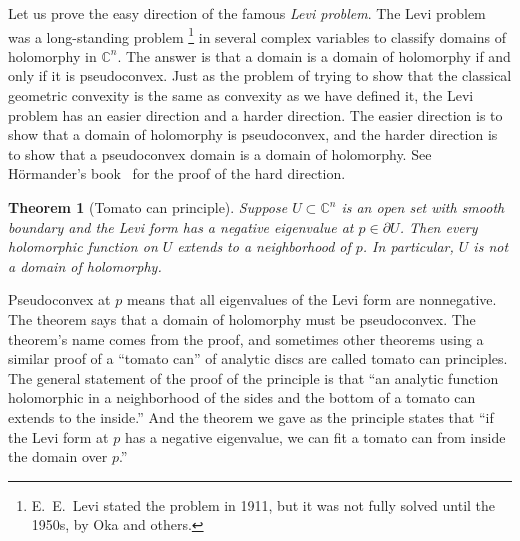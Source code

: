 \documentclass[12pt,openany]{book}
\newcommand{\C}{{\mathbb{C}}}
\newcommand{\myindex}[1]{#1\index{#1}}
\theoremstyle{plain}
\newtheorem{thm}{Theorem}[section]
\theoremstyle{remark}
\theoremstyle{definition}
\theoremstyle{exercise}
\theoremstyle{example}
\begin{document}
\medskip


Let us prove the easy direction of the famous
\emph{\myindex{Levi problem}}.  The Levi problem was a long-standing
problem%
\footnote{E.\ E.\ Levi stated the problem in 1911, but it was not fully
solved until the 1950s, by Oka and others.}
in several complex variables to classify domains of holomorphy in
$\C^n$.  The answer is that a domain is a domain of holomorphy if and only
if it is pseudoconvex.  Just as the problem of trying to show that
the classical geometric convexity is the same as convexity as we have
defined it,
the Levi problem has an easier direction and a harder direction.
The easier direction is to show that a domain of holomorphy is pseudoconvex, and
the harder direction is to show that a pseudoconvex domain is a domain of
holomorphy.  See H\"ormander's book~\cite{Hormander} for the proof
of the hard direction.

\begin{thm}[Tomato can principle] \label{thm:tomatocan}
Suppose
$U \subset \C^n$ is an open set with smooth boundary and
the Levi form has a negative eigenvalue at $p \in
\partial U$.
Then every holomorphic function on $U$
extends to a neighborhood of $p$.
In particular, $U$ is not
a domain of holomorphy.
\end{thm}

Pseudoconvex at $p$ means that all eigenvalues of the Levi form are
nonnegative.
The theorem says that a domain of holomorphy must be pseudoconvex.
The theorem's name comes from the proof, and sometimes other theorems using a
similar proof of a ``tomato can'' of analytic discs are called
tomato can principles.
The general statement of the proof of the principle is that ``an
analytic function holomorphic in a neighborhood of the sides and the bottom
of a tomato can extends to the inside.''  And the theorem we gave as
the principle states that ``if the Levi form at $p$ has a negative
eigenvalue, we can fit a tomato can from inside the domain over $p$.''
\end{document}
